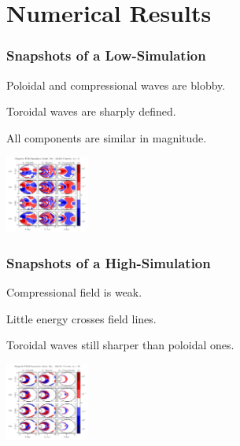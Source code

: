 \documentclass{beamer}
\begin{document}

\section{Numerical Results}


\begin{frame}
\frametitle{Snapshots of a Low-\azm Simulation}

\begin{wideitemize}
\item Poloidal and compressional waves are blobby. 
\item Toroidal waves are sharply defined. 
\item All components are similar in magnitude. 
\end{wideitemize}

\vfill

\includegraphics[width=\textwidth, height=1in]{figures/snapshot_smallm.pdf}

\end{frame}


\begin{frame}
\frametitle{Snapshots of a High-\azm Simulation}

\begin{wideitemize}
\item Compressional field is weak. 
\item Little energy crosses field lines. 
\item Toroidal waves still sharper than poloidal ones. 
\end{wideitemize}

\vfill

\includegraphics[width=\textwidth, height=1in]{figures/snapshot_bigm.pdf}

\end{frame}
\end{document}
